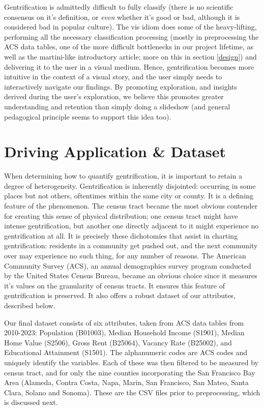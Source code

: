 \documentclass{article}
\begin{document}
    Gentrification is admittedly difficult to fully classify (there is no scientific consensus on it's definition, or \textit{even} whether it's good or bad, although it is considered bad in popular culture). The vis idiom does some of the heavy-lifting, performing all the necessary classification processing (mostly in preprocessing the ACS data tables, one of the more difficult bottlenecks in our project lifetime, as well as the martini-like introductory article; more on this in section \ref{design}) and delivering it to the user in a visual medium. Hence, gentrification becomes more intuitive in the context of a visual story, and the user simply needs to interactively navigate our findings. By promoting exploration, and insights derived during the user's exploration, we believe this promotes greater understanding and retention than simply doing a slideshow (and general pedagogical principle seems to support this idea too).

\section{Driving Application \& Dataset}
    
    When determining how to quantify gentrification, it is important to retain a degree of heterogeneity. Gentrification is inherently disjointed: occurring in some places but not others, oftentimes within the same city or county. It is a defining feature of the phenomenon. The census tract became the most obvious contender for creating this sense of physical distribution; one census tract might have intense gentrification, but another one directly adjacent to it might experience no gentrification at all. It is precisely these dichotomies that assist in charting gentrification: residents in a community get pushed out, and the next community over may experience no such thing, for any number of reasons. The American Community Survey (ACS), an annual demographics survey program conducted by the United States Census Bureau, became an obvious choice since it measures it's values on the granularity of census tracts. It ensures this feature of gentrification is preserved. It also offers a robust dataset of our attributes, described below.

    Our final dataset consists of six attributes, taken from ACS data tables from 2010-2023: Population (B01003), Median Household Income (S1901), Median Home Value (S2506), Gross Rent (B25064), Vacancy Rate (B25002), and Educational Attainment (S1501). The alphanumeric codes are ACS codes and uniquely identify the variables. Each of these was then filtered to be measured by census tract, and for only the nine counties incorporating the San Francisco Bay Area (Alameda, Contra Costa, Napa, Marin, San Francisco, San Mateo, Santa Clara, Solano and Sonoma). These are the CSV files prior to preprocessing, which is discussed next.
\end{document}
